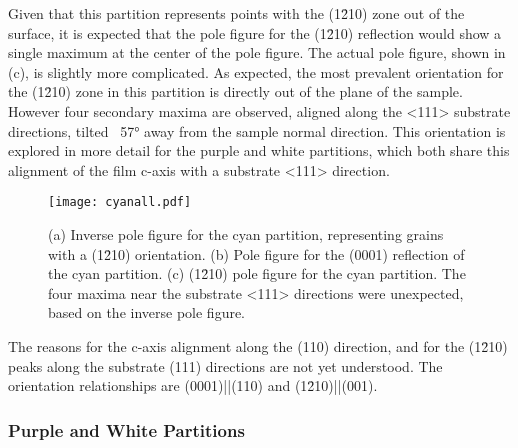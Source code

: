 			
Given that this partition represents points with the (1\={2}10) zone out of the surface, it is expected that the pole figure for the (1\={2}10) reflection would show a single maximum at the center of the pole figure. The actual pole figure, shown in (c), is slightly more complicated. As expected, the most prevalent orientation for the (1\={2}10) zone in this partition is directly out of the plane of the sample. However four secondary maxima are observed, aligned along the <111> substrate directions, tilted ~57\si{\degree} away from the sample normal direction. This orientation is explored in more detail for the purple and white partitions, which both share this alignment of the film c-axis with a substrate <111> direction.

\begin{figure}
	\texttt{[image: cyanall.pdf]}
		\caption[Pole figure for cyan partition]{%
			(a) Inverse pole figure for the cyan partition, representing grains with 
	a (1\={2}10) orientation. (b) Pole figure for the (0001) reflection of the cyan partition. (c) (1\={2}10) pole figure for the cyan partition. The four maxima near 
	the substrate <111> directions were unexpected, based on the inverse 
	pole figure.}
	\label{fig:cyanall}
	
\end{figure}

The reasons for the c-axis alignment along the (110) direction, and for the (1\={2}10) peaks along the substrate (111) directions are not yet understood. The orientation relationships are (0001)||(110) and (1\={2}10)||(001).


\subsubsection{Purple and White Partitions}
\label{subsubsec:single.growth.purplewhite}

